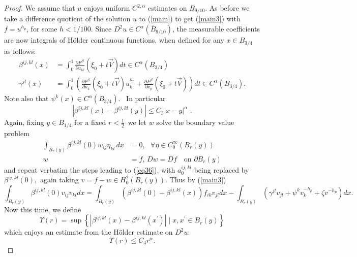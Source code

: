 \documentclass[12pt,leqno]{amsart}%
\theoremstyle{plain}
\numberwithin{equation}{section}
\theoremstyle{definition}
\begin{document}
\begin{proof}
We assume that $u$ enjoys uniform $C^{2,\alpha}$ estimates on $B_{9/10}.$ As
before we take a difference quotient of the solution $u$ to (\ref{main}) to
get (\ref{main3}) with $f=u^{h_{p}}$, for some $h<1/100$. Since $D^{2}u\in
C^{\alpha}(\bar{B}_{9/10})$, the measurable coefficients are now integrals of
H\"{o}lder continuous functions, when defined for any $x\in B_{3/4}$ as
follows:
\begin{align*}
\beta^{ij,kl}(x)  &  =\int_{0}^{1}\frac{\partial F^{jl}}{\partial u_{ik}}%
(\xi_{0}+t\vec{V})dt\in C^{\alpha}(B_{3/4})\\
\gamma^{jl}(x)  &  =\int_{0}^{1}\left(  \frac{\partial F^{jl}}{\partial u_{k}%
}({\xi_{0}+t\vec{V}})u_{k}^{h_{p}}+\frac{\partial F^{jl}}{\partial x_{p}}%
(\xi_{0}+t\vec{V})\right)  dt\in C^{\alpha}(B_{3/4}).
\end{align*}
Note also that $\psi^{k}(x)\in C^{\alpha}(B_{3/4}).$ \ In particular \
\[
\left\vert \beta^{ij,kl}(x)-\beta^{ij,kl}(y)\right\vert \leq C_{3}\left\vert
x-y\right\vert ^{\alpha}\text{ .}%
\]
Again, fixing $y\in B_{1/4}$ for a fixed $r<\frac{1}{2}$\ we let $w$ solve the
boundary value problem
\begin{align*}
\int_{B_{r}(y)}\beta^{ij,kl}(0)w_{ij}\eta_{kl}\,dx  &  =0,\ \ \ \forall\eta\in
C_{0}^{\infty}(B_{r}(y))\\
w  &  =f\text{, }D w=D f\ \ \ \text{ on }\partial B_{r}(y)
\end{align*}
and repeat verbatim the steps leading to (\ref{eq36}), with $a_{0}^{ij,kl}$
being replaced by $\beta^{ij,kl}(0),$ again taking $v=f-w\in H_{0}^{2}%
(B_{r}(y))$. Thus by (\ref{main3})
\[
\int_{B_{r}(y)}\beta^{ij,kl}(0)v_{ij}v_{kl}dx=\int_{B_{r}(y)}\left(
\beta^{ij,kl}(0)-\beta^{ij,kl}(x)\right)  f_{ik}v_{jl}dx-\int_{B_{r}%
(y)}\left(  \gamma^{jl}v_{jl} + \psi^{k}v_{k}^{-h_{p}}+\zeta v^{-h_{p}%
}\right)  dx.
\]
Now this time, we define
\begin{equation}
\Upsilon(r)=\sup\left\{  \left|  \beta^{ij,kl}(x)-\beta^{ij,kl}(x^{\prime})
\right|  \mid x,x^{\prime}\in B_{r}(y)\right\}  \label{nbb}%
\end{equation}
which enjoys an estimate from the H\"{o}lder estimate on $D^{2}u:$
\begin{equation}
\Upsilon(r)\leq C_{4}r^{\alpha}. \label{nbb1}%
\end{equation}



\end{proof}
\end{document}
